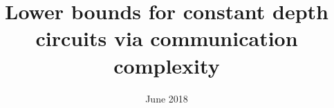 


\title{Lower bounds for constant depth circuits via communication complexity}
\author{}
\date{June 2018}



\maketitle








{}



